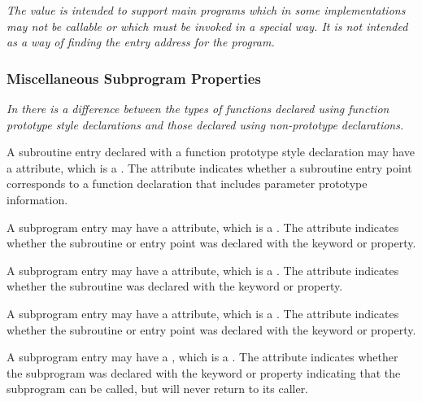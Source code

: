 \textit{The \DWCCprogram{} 
value is intended to support  main
programs which in some implementations may not be callable
or which must be invoked in a special way. It is not intended
as a way of finding the entry address for the program.}


\subsubsection{Miscellaneous Subprogram Properties}
\textit{In 
there is a difference between the types of functions
declared using function prototype style declarations and
those declared using non-prototype declarations.}

A subroutine entry declared with a function prototype style
declaration may have a
\DWATprototypedDEFN{} attribute, which is
a \CLASSflag. 
The attribute indicates whether a subroutine entry point corresponds
to a function declaration that includes parameter prototype information.

A subprogram entry may have 
a\hypertarget{chap:DWATelementalelementalpropertyofasubroutine}{}
\DWATelementalDEFN{} attribute, 
which is a . 
The attribute indicates whether the subroutine
or entry point was declared with the  keyword
or property.

A\hypertarget{chap:DWATpurepurepropertyofasubroutine}{}
subprogram entry may have a
\DWATpureDEFN{} attribute, which is
a . 
The attribute indicates whether the subroutine was
declared with the  keyword or property.

A\hypertarget{chap:DWATrecursiverecursivepropertyofasubroutine}{}
subprogram entry may have a 
\DWATrecursiveDEFN{} attribute, which
is a . 
The attribute indicates whether the subroutine
or entry point was declared with the  keyword
or property.

A subprogram entry may have a 
\DWATnoreturnDEFN{}
, 
which is a \CLASSflag. The attribute 
indicates whether the subprogram was declared with the  keyword or property 
indicating that the subprogram can be called, but will never return to its caller.

